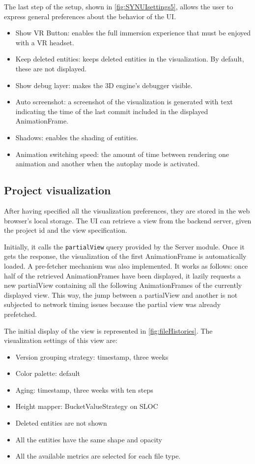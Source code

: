 The last step of the setup, shown in \autoref{fig:SYNUIsettings5}, allows the user to express general preferences about the behavior of the UI.

\begin{itemize}
    \item Show VR Button: enables the full immersion experience that must be enjoyed with a VR headset. 
    \item Keep deleted entities: keeps deleted entities in the visualization. By default, these are not displayed. 
    \item Show debug layer: makes the 3D engine's debugger visible. 
    \item Auto screenshot: a screenshot of the visualization is generated with text indicating the time of the last commit included in the displayed AnimationFrame.
    \item Shadows: enables the shading of entities. 
    \item Animation switching speed: the amount of time between rendering one animation and another when the autoplay mode is activated. 
\end{itemize}



\subsection{Project visualization}
After having specified all the visualization preferences, they are stored in the web browser's local storage. 
The UI can retrieve a view from the backend server, given the project id and the view specification. 

Initially, it calls the \texttt{partialView} query provided by the Server module. Once it gets the response, the visualization of the first AnimationFrame is automatically loaded. 
A pre-fetcher mechanism was also implemented. It works as follows: once half of the retrieved AnimationFrames have been displayed, it lazily requests a new partialView containing all the following AnimationFrames of the currently displayed view. 
This way, the jump between a partialView and another is not subjected to network timing issues because the partial view was already prefetched. 


The initial display of the view is represented in \autoref{fig:fileHistories}. The visualization settings of this view are:
\begin{itemize}
    \item Version grouping strategy: timestamp, three weeks
    \item Color palette: default
    \item Aging: timestamp, three weeks with ten steps
    \item Height mapper: BucketValueStrategy on SLOC
    \item Deleted entities are not shown
    \item All the entities have the same shape and opacity
    \item All the available metrics are selected for each file type. 
\end{itemize}

